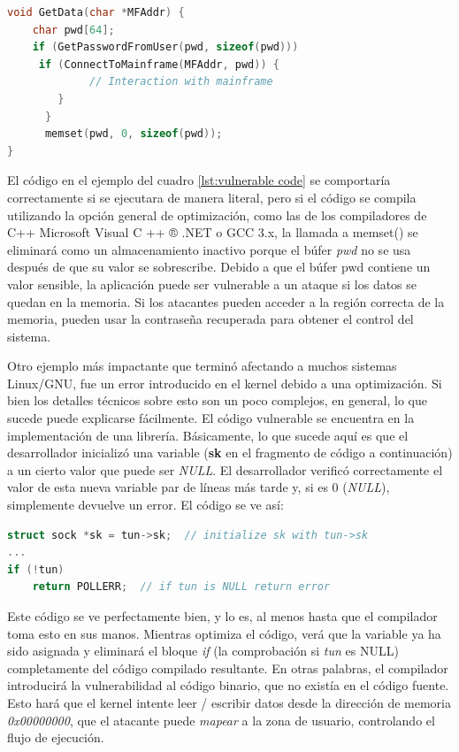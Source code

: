 \begin{lstlisting}[language={c}, label={lst:vulnerable code}, caption={Código vulnerable}, captionpos={b}, frame={shadowbox}]
void GetData(char *MFAddr) {
    char pwd[64];
    if (GetPasswordFromUser(pwd, sizeof(pwd))) 
     if (ConnectToMainframe(MFAddr, pwd)) {
             // Interaction with mainframe
        }
      }
      memset(pwd, 0, sizeof(pwd));
}
\end{lstlisting}

El código en el ejemplo del cuadro \ref{lst:vulnerable code} se comportaría correctamente si se ejecutara de manera literal, pero si el código se compila utilizando la opción general de optimización, como las de los compiladores de C++ Microsoft Visual C ++ ® .NET o GCC 3.x, la llamada a memset() se eliminará como un almacenamiento inactivo porque el búfer \textit{pwd} no se usa después de que su valor se sobrescribe. Debido a que el búfer pwd contiene un valor sensible, la aplicación puede ser vulnerable a un ataque si los datos se quedan en la memoria. Si los atacantes pueden acceder a la región correcta de la memoria, pueden usar la contraseña recuperada para obtener el control del sistema.\cite{wikiseicmuedu}
 
Otro ejemplo más impactante que terminó afectando a muchos sistemas Linux/GNU, fue un error introducido en el kernel debido a una optimización.
Si bien los detalles técnicos sobre esto son un poco complejos, en general, lo que sucede puede explicarse fácilmente. El código vulnerable se encuentra en la implementación de una librería. Básicamente, lo que sucede aquí es que el desarrollador inicializó una variable (\textbf{sk} en el fragmento de código a continuación) a un cierto valor que puede ser \textit{NULL}. El desarrollador verificó correctamente el valor de esta nueva variable par de líneas más tarde y, si es 0 (\textit{NULL}), simplemente devuelve un error. El código se ve así:\cite{iscsansedukernelvuln}

\begin{lstlisting}[language={c}, label={lst:kernel vuln}, caption={Código vulnerable 2}, captionpos={b}, frame={shadowbox}]
struct sock *sk = tun->sk;  // initialize sk with tun->sk
...
if (!tun)
    return POLLERR;  // if tun is NULL return error
\end{lstlisting}

Este código se ve perfectamente bien, y lo es, al menos hasta que el compilador toma esto en sus manos. Mientras optimiza el código, verá que la variable ya ha sido asignada y eliminará el bloque \textit{if} (la comprobación si \textit{tun} es NULL) completamente del código compilado resultante. En otras palabras, el compilador introducirá la vulnerabilidad al código binario, que no existía en el código fuente. Esto hará que el kernel intente leer / escribir datos desde la dirección de memoria \textit{0x00000000}, que el atacante puede \textit{mapear} a la zona de usuario, controlando el flujo de ejecución. 


